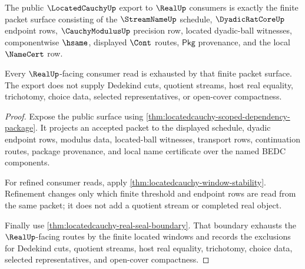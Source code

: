\begin{theorem}
\label{thm:locatedcauchy-public-real-consumer-export}
The public $\LocatedCauchyUp$ export to $\RealUp$ consumers is exactly the finite packet surface consisting of the $\StreamNameUp$ schedule, $\DyadicRatCoreUp$ endpoint rows, $\CauchyModulusUp$ precision row, located dyadic-ball witnesses, componentwise $\hsame$, displayed $\Cont$ routes, $\mathsf{Pkg}$ provenance, and the local $\NameCert$ row.

Every $\RealUp$-facing consumer read is exhausted by that finite packet surface. The export does not supply Dedekind cuts, quotient streams, host real equality, trichotomy, choice data, selected representatives, or open-cover compactness.
\end{theorem}
\begin{proof}
Expose the public surface using \autoref{thm:locatedcauchy-scoped-dependency-package}. It projects an accepted packet to the displayed schedule, dyadic endpoint rows, modulus data, located-ball witnesses, transport rows, continuation routes, package provenance, and local name certificate over the named BEDC components.

For refined consumer reads, apply \autoref{thm:locatedcauchy-window-stability}. Refinement changes only which finite threshold and endpoint rows are read from the same packet; it does not add a quotient stream or completed real object.

Finally use \autoref{thm:locatedcauchy-real-seal-boundary}. That boundary exhausts the $\RealUp$-facing routes by the finite located windows and records the exclusions for Dedekind cuts, quotient streams, host real equality, trichotomy, choice data, selected representatives, and open-cover compactness.
\end{proof}

